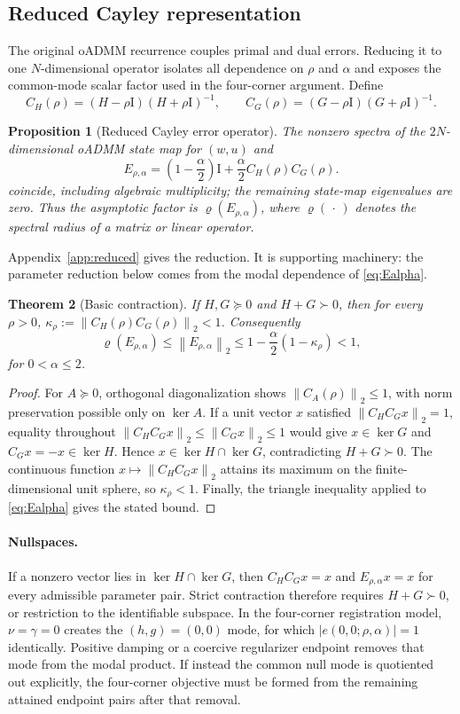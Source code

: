 \documentclass[11pt]{article}
\newtheorem{theorem}{Theorem}[section]
\newtheorem{proposition}[theorem]{Proposition}
\theoremstyle{definition}
\newcommand{\norm}[1]{\left\lVert #1\right\rVert}
\newcommand{\spr}{\varrho}
\newcommand{\Id}{\mathrm{I}}
\begin{document}
\subsection{Reduced Cayley representation}
The original oADMM recurrence couples primal and dual errors. Reducing it to
one $N$-dimensional operator isolates all dependence on $\rho$ and $\alpha$ and
exposes the common-mode scalar factor used in the four-corner argument. Define
\[
C_H(\rho)=(H-\rho\Id)(H+\rho\Id)^{-1},\qquad
C_G(\rho)=(G-\rho\Id)(G+\rho\Id)^{-1}.
\]
\begin{proposition}[Reduced Cayley error operator]\label{prop:reduced}
The nonzero spectra of the $2N$-dimensional oADMM state map for $(w,u)$ and
\begin{equation}
E_{\rho,\alpha}
=\left(1-\frac{\alpha}{2}\right)\Id
+\frac{\alpha}{2}C_H(\rho)C_G(\rho).
\label{eq:Ealpha}
\end{equation}
coincide, including algebraic multiplicity; the remaining state-map
eigenvalues are zero. Thus the asymptotic factor is
$\spr(E_{\rho,\alpha})$, where $\spr(\,\cdot\,)$ denotes the spectral radius
of a matrix or linear operator.
\end{proposition}
Appendix~\ref{app:reduced} gives the reduction. It is supporting machinery:
the parameter reduction below comes from the modal dependence of
\eqref{eq:Ealpha}.

\begin{theorem}[Basic contraction]\label{thm:contraction}
If $H,G\succeq0$ and $H+G\succ0$, then for every $\rho>0$,
$\kappa_\rho:=\norm{C_H(\rho)C_G(\rho)}_2<1$. Consequently
\[
\spr(E_{\rho,\alpha})\le\norm{E_{\rho,\alpha}}_2
\le 1-\frac{\alpha}{2}(1-\kappa_\rho)<1,
\]
for $0<\alpha\le2$.
\end{theorem}
\begin{proof}
For $A\succeq0$, orthogonal diagonalization shows
$\norm{C_A(\rho)}_2\le1$, with norm preservation possible only on $\ker A$.
If a unit vector $x$ satisfied $\norm{C_HC_Gx}_2=1$, equality throughout
$\norm{C_HC_Gx}_2\le\norm{C_Gx}_2\le1$ would give
$x\in\ker G$ and $C_Gx=-x\in\ker H$. Hence
$x\in\ker H\cap\ker G$, contradicting $H+G\succ0$. The continuous function
$x\mapsto\norm{C_HC_Gx}_2$ attains its maximum on the finite-dimensional unit
sphere, so $\kappa_\rho<1$. Finally, the triangle inequality applied to
\eqref{eq:Ealpha} gives the stated bound.
\end{proof}

\paragraph{Nullspaces.}
If a nonzero vector lies in $\ker H\cap\ker G$, then
$C_HC_Gx=x$ and $E_{\rho,\alpha}x=x$ for every admissible parameter pair.
Strict contraction therefore requires $H+G\succ0$, or restriction to the
identifiable subspace. In the four-corner registration model,
$\nu=\gamma=0$ creates the $(h,g)=(0,0)$ mode, for which
$|e(0,0;\rho,\alpha)|=1$ identically. Positive damping or a coercive
regularizer endpoint removes that mode from the modal product. If instead the
common null mode is quotiented out explicitly, the four-corner objective must
be formed from the remaining attained endpoint pairs after that removal.
\end{document}
